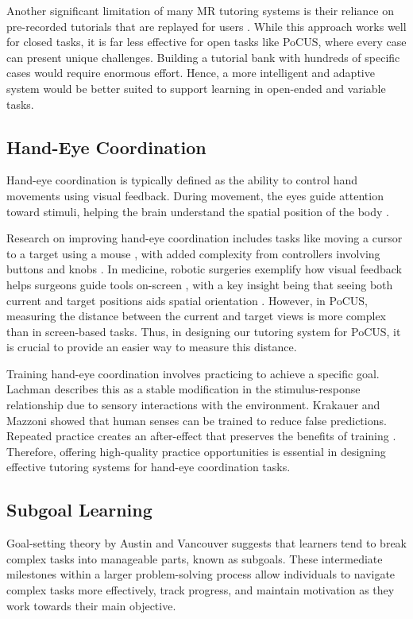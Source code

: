 Another significant limitation of many MR tutoring systems is their reliance on pre-recorded tutorials that are replayed for users \cite{huang2021adaptutar, chidambaram2021processar, liu2023instrumentar, whitlock2020authar}. While this approach works well for closed tasks, it is far less effective for open tasks like PoCUS, where every case can present unique challenges. Building a tutorial bank with hundreds of specific cases would require enormous effort. Hence, a more intelligent and adaptive system would be better suited to support learning in open-ended and variable tasks.


\subsection{Hand-Eye Coordination}
Hand-eye coordination is typically defined as the ability to control hand movements using visual feedback. During movement, the eyes guide attention toward stimuli, helping the brain understand the spatial position of the body \cite{ballard1992hand, zhu2020hand}.

Research on improving hand-eye coordination includes tasks like moving a cursor to a target using a mouse \cite{smith2000hand, huang2012user}, with added complexity from controllers involving buttons and knobs \cite{sailer2005eye}. In medicine, robotic surgeries exemplify how visual feedback helps surgeons guide tools on-screen \cite{gao2017modeling}, with a key insight being that seeing both current and target positions aids spatial orientation \cite{horstmann2005target}. However, in PoCUS, measuring the distance between the current and target views is more complex than in screen-based tasks. Thus, in designing our tutoring system for PoCUS, it is crucial to provide an easier way to measure this distance.

Training hand-eye coordination involves practicing to achieve a specific goal. Lachman \cite{lachman1997learning} describes this as a stable modification in the stimulus-response relationship due to sensory interactions with the environment. Krakauer and Mazzoni \cite{krakauer2011human} showed that human senses can be trained to reduce false predictions. Repeated practice creates an after-effect that preserves the benefits of training \cite{zhou2023method}. Therefore, offering high-quality practice opportunities is essential in designing effective tutoring systems for hand-eye coordination tasks.

\subsection{Subgoal Learning}
Goal-setting theory by Austin and Vancouver \cite{austin1996goal} suggests that learners tend to break complex tasks into manageable parts, known as subgoals. These intermediate milestones within a larger problem-solving process allow individuals to navigate complex tasks more effectively, track progress, and maintain motivation as they work towards their main objective. 

